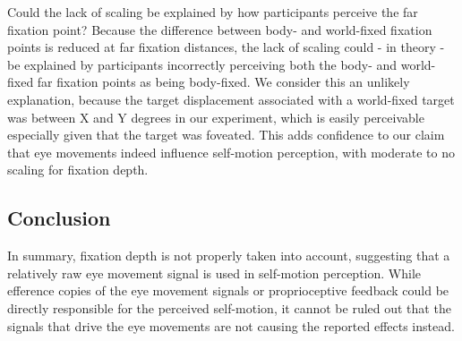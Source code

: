 Could the lack of scaling be explained by how participants perceive the far fixation point? Because the difference between body- and world-fixed fixation points is reduced at far fixation distances, the lack of scaling could - in theory - be explained by participants incorrectly perceiving both the body- and world-fixed far fixation points as being body-fixed. We consider this an unlikely explanation, because the target displacement associated with a world-fixed target was between X and Y degrees in our experiment, which is easily perceivable especially given that the target was foveated. This adds confidence to our claim that eye movements indeed influence self-motion perception, with moderate to no scaling for fixation depth.

\subsection{Conclusion}
In summary, fixation depth is not properly taken into account, suggesting that a relatively raw eye movement signal is used in self-motion perception. While efference copies of the eye movement signals or proprioceptive feedback could be directly responsible for the perceived self-motion, it cannot be ruled out that the signals that drive the eye movements are not causing the reported effects instead.
